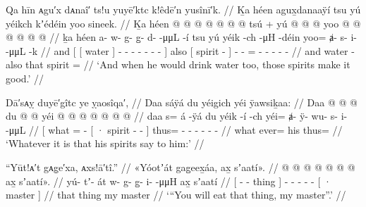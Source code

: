 \ex\label{ex:100-223-water-he-drinks}%
%
\begingl
	\glpreamble	Qa hīn ᴀgu′x dᴀnaî′ ts!u yuyē′ktc k!êdē′n yusînī′k. //
	\glpreamble	Ḵa héen agux̱danaaÿí tsu yú yéikch kʼédéin yoo sineek. //
	\gla	Ḵa {} {} héen {}
			 @ {} @ {} @ {} @ {} @ {} @ {} @ {} {}
			tsú +
		{} yú  @ {} {} 
		 @ {} @ {}
		yoo @  @ {} @ {} @ {} @ {} @ {} //
	\glb	ḵa {} {} héen {}
			a- w- g- g̱- d-  -μμL -í {}
			tsu
		{} yú yéik -ch {}
		 -μH -déin
		yoo= ⱥ- s- i-  -μμL -k //
	\glc	and {}[ {}[ water {}]
			- - - - -  - - {}]
			also
		{}[  spirit - {}]
		 - -
		= - - -  - - //
	\gld	and {} {} water {} 
			 {} {} {} {} {} {} - {} also
		{} that spirit {} {} 
		 {} {}
		=  {} {} {} {} {} //
	\glft	‘And when he would drink water too, those spirits make it good.’
		//
\endgl
\xe

\ex\label{ex:100-224-whatever-spirit-says}%
%
\begingl
	\glpreamble	Dā′sᴀỵ duyē′gîtc ye ỵaosîqa′, //
	\glpreamble	Daa sáÿá du yéigich yéi ÿawsiḵaa: //
	\gla	{} Daa  @ {} @ {} @ {}
		{} du  @ {} @ {} {}
		yéi @  @ {} @ {} @ {} @ {} @ {} @ {} //
	\glb	{} daa s= {} á -ÿá
		{} du yéik -í -ch {}
		yéi= ⱥ- ÿ- wu- s- i-  -μμL //
	\glc	{}[ what = \llap{]~}{}  -
		{}[ · spirit - - {}]
		thus= - - - - -  - //
	\gld	{} what ever= {}  {}
		{} his  {} {} {}
		thus=  {} {} {} {} {} {} //
	\glft	‘Whatever it is that his spirits say to him:’
		//
\endgl
\xe

\ex\label{ex:100-225-eat-that-master}%
%
\begingl
	\glpreamble	“Yūt!ᴀ′t gᴀg̣e′xa, ᴀxs!ā′tî.” //
	\glpreamble	«\!Yóotʼát gag̱eex̱áa, ax̱ sʼaatí\!». //
	\gla	{}  @ {} @ {} {} 
		 @ {} @ {} @ {} @ {} @ {}
		{} ax̱ sʼaatí\!». {} //
	\glb	{} yú- tʼ- át {}
		w- g- g̱- i-  -μμH
		{} ax̱ sʼaatí {} //
	\glc	{}[ - - thing {}]
		- - - -  -
		{}[ · master {}] //
	\gld	{} that {} thing {}
		 {} {} {} {} {}
		{} my master {} //
	\glft	‘“You will eat that thing, my master”.’
		//
\endgl
\xe


